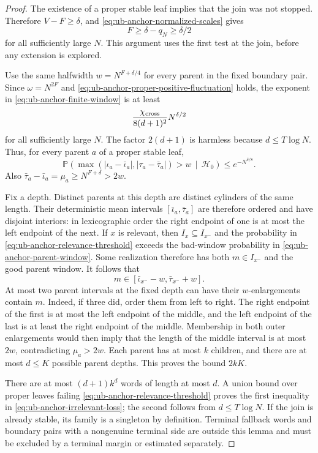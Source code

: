 \documentclass[11pt]{article}
\numberwithin{equation}{section}
\newcommand{\Pp}{\mathbb P}
\newcommand{\1}{\mathbf 1}
\begin{document}
\begin{proof}
The existence of a proper stable leaf implies that the join was not
stopped.  Therefore $V-F\ge\delta$, and
\eqref{eq:ub-anchor-normalized-scales} gives
\begin{equation}
\label{eq:ub-anchor-proper-positive-fluctuation}
 F\ge\delta-q_N\ge\delta/2
\end{equation}
for all sufficiently large $N$.  This argument uses the first test
at the join, before any extension is explored.

Use the same halfwidth $w=N^{F+\delta/4}$ for every parent in the
fixed boundary pair.  Since $\omega=N^{2F}$ and
\eqref{eq:ub-anchor-proper-positive-fluctuation} holds, the exponent
in \eqref{eq:ub-anchor-finite-window} is at least
\[
 \frac{\chi_{\rm cross}}{8(d+1)^2}N^{\delta/2}
\]
for all sufficiently large $N$.  The factor $2(d+1)$ is harmless
because $d\le T\log N$.  Thus, for every parent $a$ of a proper
stable leaf,
\begin{equation}
\label{eq:ub-anchor-parent-window}
 \Pp\left(
 \max(|\iota_a-\bar\iota_a|,|\tau_a-\bar\tau_a|)>w
       \,\middle|\,\mathcal H_0\right)
 \le e^{-N^{\delta/8}}.
\end{equation}
Also $\bar\tau_a-\bar\iota_a=\mu_a\ge N^{F+\delta}>2w$.

Fix a depth.  Distinct parents at this depth are distinct cylinders
of the same length.  Their deterministic mean intervals
$[\bar\iota_a,\bar\tau_a]$ are therefore ordered and have disjoint
interiors: in lexicographic order the right endpoint of one is at
most the left endpoint of the next.  If $x$ is relevant, then
$I_x\subseteq I_{x^-}$ and the probability in
\eqref{eq:ub-anchor-relevance-threshold} exceeds the bad-window
probability in \eqref{eq:ub-anchor-parent-window}.  Some realization
therefore has both $m\in I_{x^-}$ and the good parent window.  It
follows that
\[
 m\in[\bar\iota_{x^-}-w,\bar\tau_{x^-}+w].
\]
At most two parent intervals at the fixed depth can have their
$w$-enlargements contain $m$.  Indeed, if three did, order them
from left to right.  The right endpoint of the first is at most
the left endpoint of the middle, and the left endpoint of the last
is at least the right endpoint of the middle.  Membership in both
outer enlargements would then imply that the length of the middle
interval is at most $2w$, contradicting $\mu_a>2w$.
Each parent has at most $k$ children, and there are at most $d\le K$
possible parent depths.  This proves the bound $2kK$.

There are at most $(d+1)k^d$ words of length at most $d$.  A union
bound over proper leaves failing
\eqref{eq:ub-anchor-relevance-threshold} proves the first inequality
in \eqref{eq:ub-anchor-irrelevant-loss}; the second follows from
$d\le T\log N$.  If the join is already stable, its family is a
singleton by definition.  Terminal fallback words and boundary
pairs with a nongenuine terminal side are outside this lemma and
must be excluded by a terminal margin or estimated separately.
\end{proof}
\end{document}
